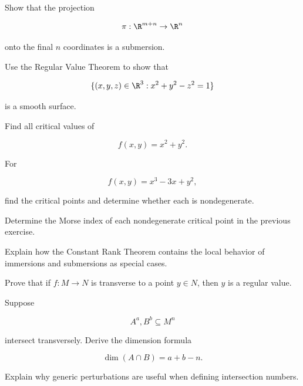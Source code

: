 \begin{exercise}[3]
Show that the projection

\[
\pi:\R^{m+n}\to\R^n
\]

onto the final \(n\) coordinates is a submersion.
\end{exercise}

\begin{exercise}[3]
Use the Regular Value Theorem to show that

\[
\{(x,y,z)\in\R^3:x^2+y^2-z^2=1\}
\]

is a smooth surface.
\end{exercise}

\begin{exercise}[3]
Find all critical values of

\[
f(x,y)=x^2+y^2.
\]
\end{exercise}

\begin{exercise}[3]
For

\[
f(x,y)=x^3-3x+y^2,
\]

find the critical points and determine whether each is nondegenerate.
\end{exercise}

\begin{exercise}[3]
Determine the Morse index of each nondegenerate critical point in the
previous exercise.
\end{exercise}

\begin{exercise}[3]
Explain how the Constant Rank Theorem contains the local behavior of
immersions and submersions as special cases.
\end{exercise}

\begin{exercise}[3]
Prove that if \(f:M\to N\) is transverse to a point \(y\in N\), then \(y\)
is a regular value.
\end{exercise}

\begin{exercise}[3]
Suppose

\[
A^a,B^b\subseteq M^n
\]

intersect transversely. Derive the dimension formula

\[
\dim(A\cap B)=a+b-n.
\]
\end{exercise}

\begin{exercise}[3]
Explain why generic perturbations are useful when defining intersection
numbers.
\end{exercise}

